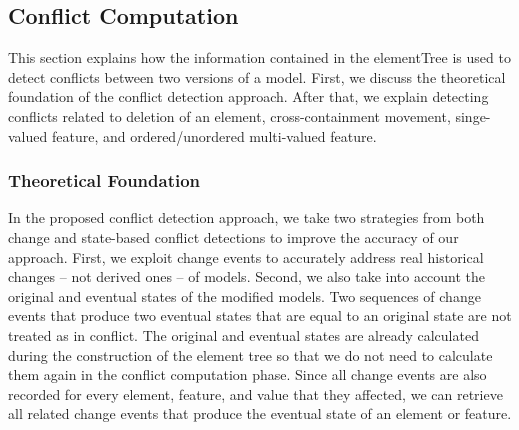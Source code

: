 \subsection{Conflict Computation} 
\label{sec:conflict_computation} 
This section explains how the information contained in the \textsf{elementTree} is used to detect conflicts between two versions of a model. First, we discuss the theoretical foundation of the conflict detection approach. After that, we explain detecting conflicts related to deletion of an element, cross-containment movement, singe-valued feature, and ordered/unordered multi-valued feature. 

\subsubsection{Theoretical Foundation} 
\label{sec:theoretical_foundation}
In the proposed conflict detection approach, we take two strategies from both change and state-based conflict detections to improve the accuracy of our approach. 
First, we exploit change events to accurately address real historical changes -- not derived ones -- of models. Second, we also take into account the original and eventual states of the modified models. Two sequences of change events that produce two eventual states that are equal to an original state are not treated as in conflict. The original and eventual states are already calculated during the construction of the \textsf{element tree} so that we do not need to calculate them again in the conflict computation phase. Since all change events are also recorded for every element, feature, and value that they affected, we can retrieve all related change events that produce the eventual state of an element or feature. 


